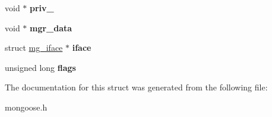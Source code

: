 \begin{DoxyCompactItemize}
\begin{tabbing}
\end{tabbing}\item 
\mbox{\label{structmg__connection_aeb5efea496ac74ed2e0b8864f4fd6f65}} 
void $\ast$ {\bfseries priv\+\_}
\item 
\mbox{\label{structmg__connection_a19cb5ee4c2402582dcf4cb6a4f899136}} 
void $\ast$ {\bfseries mgr\+\_\+data}
\item 
\mbox{\label{structmg__connection_a6f337461553de516901473bd8bb11a0a}} 
struct \hyperlink{structmg__iface}{mg\+\_\+iface} $\ast$ {\bfseries iface}
\item 
\mbox{\label{structmg__connection_aa47edda11152dd7769a76d806a87e1aa}} 
unsigned long {\bfseries flags}
\end{DoxyCompactItemize}


The documentation for this struct was generated from the following file\+:\begin{DoxyCompactItemize}
\item 
mongoose.\+h\end{DoxyCompactItemize}
